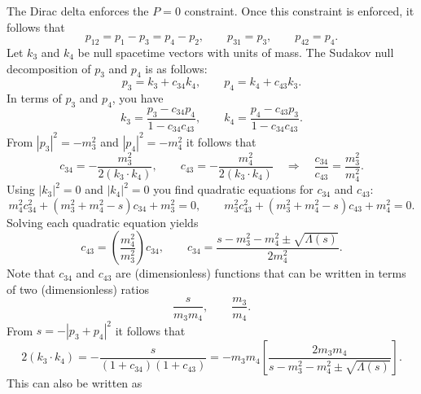 The Dirac delta enforces the $P = 0$ constraint. Once this constraint is enforced, it follows that
\begin{equation}
	p_{12} = p_{1} - p_{3} = p_{4} - p_{2}, \qquad p_{31} = p_{3}, \qquad p_{42} = p_{4}.
\end{equation}
Let $k_{3}$ and $k_{4}$ be null spacetime vectors with units of mass. The Sudakov null decomposition of $p_{3}$ and $p_{4}$ is as follows:
\begin{equation}
	p_{3} = k_{3} + c_{34} k_{4}, \qquad p_{4} = k_{4} + c_{43} k_{3}.
\end{equation}
In terms of $p_{3}$ and $p_{4}$, you have
\begin{equation}
	k_{3} = \frac{p_{3} - c_{34} p_{4}}{1 - c_{34} c_{43}}, \qquad k_{4} = \frac{p_{4} - c_{43} p_{3}}{1 - c_{34} c_{43}}.
	\label{eq:k3_and_k4}
\end{equation}
From $|p_{3}|^{2} = -m_{3}^{2}$ and $|p_{4}|^{2} = -m_{4}^{2}$ it follows that
\begin{equation}
	c_{34} = - \frac{m_{3}^{2}}{2 (k_{3} \cdot k_{4})}, \qquad c_{43} = - \frac{m_{4}^{2}}{2 (k_{3} \cdot k_{4})} \quad \Longrightarrow \quad \frac{c_{34}}{c_{43}} = \frac{m_{3}^{2}}{m_{4}^{2}}.
\end{equation}
Using $|k_{3}|^{2} = 0$ and $|k_{4}|^{2} = 0$ you find quadratic equations for $c_{34}$ and $c_{43}$:
\begin{equation}
	m_{4}^{2} c_{34}^{2} + (m_{3}^{2} + m_{4}^{2} - s) c_{34} + m_{3}^{2} = 0, \qquad m_{3}^{2} c_{43}^{2} + (m_{3}^{2} + m_{4}^{2} - s) c_{43} + m_{4}^{2} = 0.
\end{equation}
Solving each quadratic equation yields
\begin{equation}
	c_{43} = \left( \frac{m_{4}^{2}}{m_{3}^{2}} \right) c_{34}, \qquad c_{34} = \frac{s - m_{3}^{2} - m_{4}^{2} \pm \sqrt{\Lambda(s)}}{2 m_{4}^{2}}.
\end{equation}
Note that $c_{34}$ and $c_{43}$ are (dimensionless) functions that can be written in terms of two (dimensionless) ratios
\begin{equation}
	\frac{s}{m_{3} m_{4}}, \qquad \frac{m_{3}}{m_{4}}.
\end{equation}
From $s = -|p_{3} + p_{4}|^{2}$ it follows that
\begin{equation}
	2 (k_{3} \cdot k_{4}) = - \frac{s}{(1 + c_{34})(1 + c_{43})} = -m_{3} m_{4} \left[ \frac{2 m_{3} m_{4}}{s - m_{3}^{2} - m_{4}^{2} \pm \sqrt{\Lambda(s)}} \right].
\end{equation}
This can also be written as
